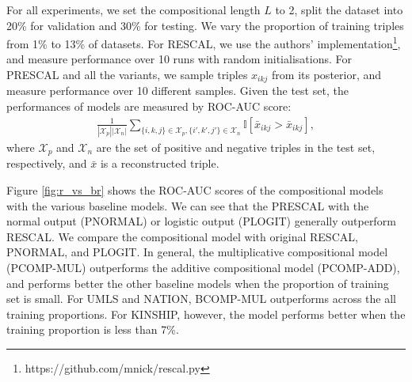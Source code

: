 For all experiments, we set the compositional length $L$ to 2, split the dataset into 20\% for validation and 30\% for testing. We vary the proportion of training triples
from 1\% to 13\% of datasets. For RESCAL, we use the authors' implementation\footnote{https://github.com/mnick/rescal.py}, and measure performance over 10 runs with random initialisations. For PRESCAL and all the variants, we sample triples $x_{ikj}$ from its posterior, and measure performance over 10 different samples.
Given the test set, the performances of models are measured by ROC-AUC score:
\begin{align}
\frac{1}{|\mathcal{X}_p|  |\mathcal{X}_n|} \sum_{\{i,k,j\} \in \mathcal{X}_p, \{i',k',j'\} \in \mathcal{X}_n} \mathbb{I}[\bar{x}_{ikj} > \bar{x}_{ikj}],
\end{align}
where $\mathcal{X}_p$ and $\mathcal{X}_n$ are the set of positive and negative triples in the test set, respectively, and $\bar{x}$ is a reconstructed triple.

Figure \ref{fig:r_vs_br} shows the ROC-AUC scores of the compositional models 
with the various baseline models. We can see that the PRESCAL with 
the normal output (PNORMAL) or logistic output (PLOGIT) generally outperform RESCAL. 
We compare the compositional model with original RESCAL, PNORMAL, and PLOGIT. 
In general, the multiplicative compositional model (PCOMP-MUL) outperforms 
the additive compositional model (PCOMP-ADD), and performs better the other baseline models 
when the proportion of training set is small. For UMLS and NATION, BCOMP-MUL outperforms 
across the all training proportions. 
For KINSHIP, however, the model performs better when the training proportion is less than 7\%.

